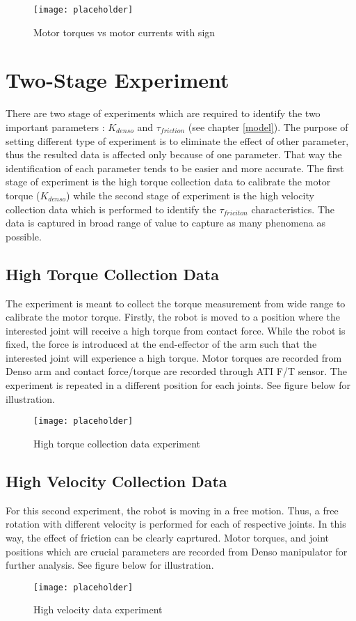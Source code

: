 \begin{figure}[h]
    \centering
    \texttt{[image: placeholder]}
    \caption{Motor torques vs motor currents with sign}
    \label{fig:current vs torque}
\end{figure}


\section{Two-Stage Experiment}
There are two stage of experiments which are required to identify the two important parameters : $K_{denso}$ and $\tau_{friction}$ (see chapter \ref{model}). The purpose of setting different type of experiment is to eliminate the effect of other parameter, thus the resulted data is affected only because of one parameter. That way the identification of each parameter tends to be easier and more accurate. The first stage of experiment is the high torque collection data to calibrate the motor torque ($K_{denso}$) while the second stage of experiment is the high velocity collection data which is performed to identify the $\tau_{friciton}$ characteristics. The data is captured in broad range of value to capture as many phenomena as possible.


\subsection{High Torque Collection Data}
\label{push exp}

The experiment is meant to collect the torque measurement from wide range to calibrate the motor torque. Firstly, the robot is moved to a position where the interested joint will receive a high torque from contact force. While the robot is fixed, the force is introduced at the end-effector of the arm such that the interested joint will experience a high torque. Motor torques are recorded from Denso arm and contact force/torque are recorded through ATI F/T sensor. The experiment is repeated in a different position for each joints. See figure below for illustration.

\begin{figure}[h]
    \centering
    \texttt{[image: placeholder]}
    \caption{High torque collection data experiment}
\end{figure}


\subsection{High Velocity Collection Data}
\label{fric exp}

For this second experiment, the robot is moving in a free motion. Thus, a free rotation with different velocity is performed for each of respective joints. In this way, the effect of friction can be clearly caprtured. Motor torques, and joint positions which are crucial parameters are recorded from Denso manipulator for further analysis. See figure below for illustration.
\begin{figure}[h]
    \centering
    \texttt{[image: placeholder]}
    \caption{High velocity data experiment}
\end{figure}


